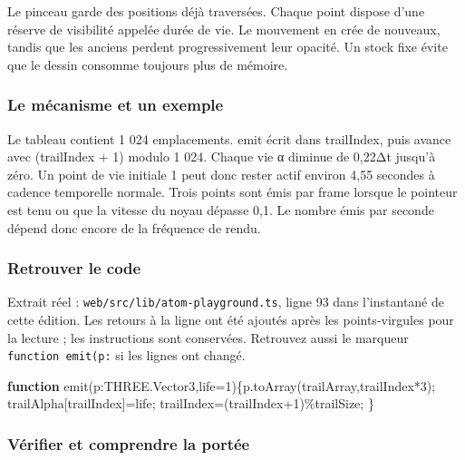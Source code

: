 \documentclass[
  canadien,
  11pt,
  letterpaper,
]{article}
\newenvironment{Shaded}{}{}
\newcommand{\AttributeTok}[1]{\textcolor[rgb]{0.49,0.56,0.16}{#1}}
\newcommand{\DecValTok}[1]{\textcolor[rgb]{0.25,0.63,0.44}{#1}}
\newcommand{\FunctionTok}[1]{\textcolor[rgb]{0.02,0.16,0.49}{#1}}
\newcommand{\KeywordTok}[1]{\textcolor[rgb]{0.00,0.44,0.13}{\textbf{#1}}}
\newcommand{\NormalTok}[1]{#1}
\newcommand{\OperatorTok}[1]{\textcolor[rgb]{0.40,0.40,0.40}{#1}}
\begin{document}
Le pinceau garde des positions déjà traversées. Chaque point dispose
d'une réserve de visibilité appelée durée de vie. Le mouvement en crée
de nouveaux, tandis que les anciens perdent progressivement leur
opacité. Un stock fixe évite que le dessin consomme toujours plus de
mémoire.

\subsubsection{Le mécanisme et un
exemple}\label{le-muxe9canisme-et-un-exemple-1}

Le tableau contient 1 024 emplacements. emit écrit dans trailIndex, puis
avance avec (trailIndex + 1) modulo 1 024. Chaque vie α diminue de
0,22Δt jusqu'à zéro. Un point de vie initiale 1 peut donc rester actif
environ 4,55 secondes à cadence temporelle normale. Trois points sont
émis par frame lorsque le pointeur est tenu ou que la vitesse du noyau
dépasse 0,1. Le nombre émis par seconde dépend donc encore de la
fréquence de rendu.

\subsubsection{Retrouver le code}\label{retrouver-le-code-1}

Extrait réel : \texttt{web/src/lib/atom-playground.ts}, ligne 93 dans
l'instantané de cette édition. Les retours à la ligne ont été ajoutés
après les points-virgules pour la lecture ; les instructions sont
conservées. Retrouvez aussi le marqueur \texttt{function\ emit(p:} si
les lignes ont changé.

\begin{Shaded}
\begin{Highlighting}[]
\KeywordTok{function} \FunctionTok{emit}\NormalTok{(p}\OperatorTok{:}\NormalTok{THREE}\OperatorTok{.}\AttributeTok{Vector3}\OperatorTok{,}\NormalTok{life}\OperatorTok{=}\DecValTok{1}\NormalTok{)\{p}\OperatorTok{.}\FunctionTok{toArray}\NormalTok{(trailArray}\OperatorTok{,}\NormalTok{trailIndex}\OperatorTok{*}\DecValTok{3}\NormalTok{)}\OperatorTok{;}
\NormalTok{trailAlpha[trailIndex]}\OperatorTok{=}\NormalTok{life}\OperatorTok{;}
\NormalTok{trailIndex}\OperatorTok{=}\NormalTok{(trailIndex}\OperatorTok{+}\DecValTok{1}\NormalTok{)}\OperatorTok{\%}\NormalTok{trailSize}\OperatorTok{;}
\NormalTok{\}}
\end{Highlighting}
\end{Shaded}

\subsubsection{Vérifier et comprendre la
portée}\label{vuxe9rifier-et-comprendre-la-portuxe9e-1}
\end{document}
